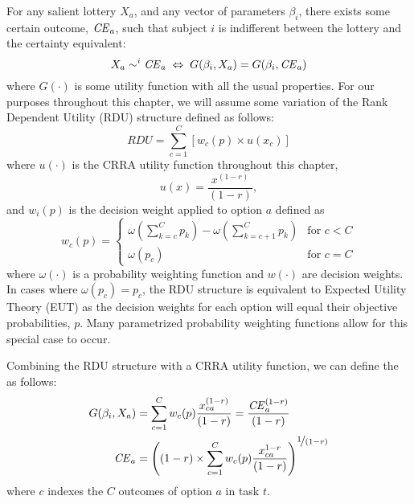 \documentclass[../main.tex]{subfiles}
\begin{document}
For any salient lottery $X_a$, and any vector of parameters $\beta_i$, there exists some certain outcome, $\mathit{CE}_a$, such that subject $i$ is indifferent between the lottery and the certainty equivalent:
\begin{equation}
	\label{eq3:CE.indiff}
	X_a \sim^i {\mathit{CE}}_a \;\Leftrightarrow\; G(\beta_i,X_a) = G(\beta_i, {\mathit{CE}}_a)
\end{equation}
\noindent where $G(\cdot)$ is some utility function with all the usual properties.
For our purposes throughout this chapter, we will assume some variation of the Rank Dependent Utility (RDU) structure defined as follows:
\begin{equation}
	\label{eq3:RDU}
	RDU = \sum_{c=1}^{C} \left[ w_c(p) \times u(x_c) \right]
\end{equation}
\noindent where $u(\cdot)$ is the CRRA utility function throughout this chapter,
\begin{equation}
	\label{eq3:CRRA}
	u(x) = \frac{x^{(1-r)}}{(1-r)} ,
\end{equation}
\noindent and $w_i(p)$ is the decision weight applied to option $a$ defined as
\begin{equation}
	\label{eq3:dweight}
	w_c(p) =
	\begin{cases}
		\omega\left(\displaystyle\sum_{k=c}^C p_k\right) - \omega\left(\displaystyle\sum_{k=c+1}^C p_k\right) & \text{for } c<C \\
		\omega(p_c) & \text{for } c = C
	\end{cases}
\end{equation}
\noindent where $\omega(\cdot)$ is a probability weighting function and $w(\cdot)$ are decision weights.
In cases where $\omega(p_c) = p_c$, the RDU structure is equivalent to Expected Utility Theory (EUT) as the decision weights for each option will equal their objective probabilities, $p$.
Many parametrized probability weighting functions allow for this special case to occur.

Combining the RDU structure with a CRRA utility function, we can define the {\CE} as follows:
\begin{align}
	\label{eq3:CEcalc}
	\begin{split}
		G(\beta_i,X_a) &= \sum_{c=1}^{C} w_c(p) \frac{x_{ca}^{(1-r)}}{(1-r)} = \frac{ {\mathit{CE}}_a^{(1-r)}}{(1-r)}\\
		{\mathit{CE}}_a &=  \left( (1-r) \times \sum_{c=1}^{C} w_c(p) \frac{x_{ca}^{1-r}}{(1-r)} \right)^{ \displaystyle\nicefrac{1}{(1-r)} }
	\end{split}
\end{align}
\noindent where $c$ indexes the $C$ outcomes of option $a$ in task $t$.
\end{document}
